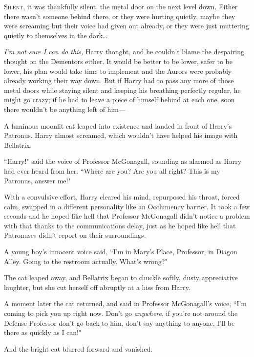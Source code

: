 
\lettrine{S}{ilent}, it was thankfully silent, the metal door on the next level down. Either there wasn't someone behind there, or they were hurting quietly, maybe they were screaming but their voice had given out already, or they were just muttering quietly to themselves in the dark{\ldots}

\emph{I'm not sure I can do this,} Harry thought, and he couldn't blame the despairing thought on the Dementors either. It would be better to be lower, safer to be lower, his plan would take time to implement and the Aurors were probably already working their way down. But if Harry had to pass any more of those metal doors while staying silent and keeping his breathing perfectly regular, he might go crazy; if he had to leave a piece of himself behind at each one, soon there wouldn't be anything left of him—

A luminous moonlit cat leaped into existence and landed in front of Harry's Patronus. Harry almost screamed, which wouldn't have helped his image with Bellatrix.

``Harry!" said the voice of Professor McGonagall, sounding as alarmed as Harry had ever heard from her. ``Where are you? Are you all right? This is my Patronus, answer me!"

With a convulsive effort, Harry cleared his mind, repurposed his throat, forced calm, swapped in a different personality like an Occlumency barrier. It took a few seconds and he hoped like hell that Professor McGonagall didn't notice a problem with that thanks to the communications delay, just as he hoped like hell that Patronuses didn't report on their surroundings.

A young boy's innocent voice said, ``I'm in Mary's Place, Professor, in Diagon Alley. Going to the restroom actually. What's wrong?"

The cat leaped away, and Bellatrix began to chuckle softly, dusty appreciative laughter, but she cut herself off abruptly at a hiss from Harry.

A moment later the cat returned, and said in Professor McGonagall's voice, ``I'm coming to pick you up right now. Don't go \emph{anywhere}, if you're not around the Defense Professor don't go back to him, don't say anything to anyone, I'll be there as quickly as I can!"

And the bright cat blurred forward and vanished.

